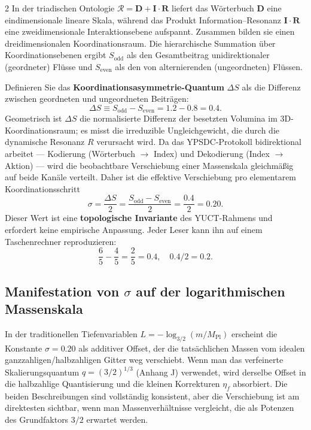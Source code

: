 \documentclass[11pt,a4paper]{article}
\begin{document}
\begin{multicols}{2}
		In der triadischen Ontologie \(\mathcal{R} = \mathbf{D} + \mathbf{I}\!\cdot\!\mathbf{R}\) liefert das Wörterbuch \(\mathbf{D}\) eine eindimensionale lineare Skala, während das Produkt Information–Resonanz \(\mathbf{I}\!\cdot\!\mathbf{R}\) eine zweidimensionale Interaktionsebene aufspannt. Zusammen bilden sie einen dreidimensionalen Koordinationsraum. Die hierarchische Summation über Koordinationsebenen ergibt \(S_{\mathrm{odd}}\) als den Gesamtbeitrag unidirektionaler (geordneter) Flüsse und \(S_{\mathrm{even}}\) als den von alternierenden (ungeordneten) Flüssen.
		
		Definieren Sie das \textbf{Koordinationsasymmetrie-Quantum} \(\Delta S\) als die Differenz zwischen geordneten und ungeordneten Beiträgen:
		\begin{equation}
			\Delta S \equiv S_{\mathrm{odd}} - S_{\mathrm{even}} = 1.2 - 0.8 = 0.4.
			\label{eq:Deltas}
		\end{equation}
		Geometrisch ist \(\Delta S\) die normalisierte Differenz der besetzten Volumina im 3D-Koordinationsraum; es misst die irreduzible Ungleichgewicht, die durch die dynamische Resonanz \(R\) verursacht wird. Da das YPSDC-Protokoll bidirektional arbeitet — Kodierung (Wörterbuch $\to$ Index) und Dekodierung (Index $\to$ Aktion) — wird die beobachtbare Verschiebung einer Massenskala gleichmäßig auf beide Kanäle verteilt. Daher ist die effektive Verschiebung pro elementarem Koordinationsschritt
		\begin{equation}
			\boxed{\sigma = \frac{\Delta S}{2} = \frac{S_{\mathrm{odd}} - S_{\mathrm{even}}}{2} = \frac{0.4}{2} = 0.20.}
			\label{eq:sigma}
		\end{equation}
		Dieser Wert ist eine \textbf{topologische Invariante} des YUCT-Rahmens und erfordert keine empirische Anpassung. Jeder Leser kann ihn auf einem Taschenrechner reproduzieren:
		\[
		\frac{6}{5} - \frac{4}{5} = \frac{2}{5} = 0.4,\quad 0.4 / 2 = 0.2.
		\]
		
		\subsection{Manifestation von \(\sigma\) auf der logarithmischen Massenskala}
		
		In der traditionellen Tiefenvariablen \(L = -\log_{3/2}(m/M_{\mathrm{Pl}})\) erscheint die Konstante \(\sigma = 0.20\) als additiver Offset, der die tatsächlichen Massen vom idealen ganzzahligen/halbzahligen Gitter weg verschiebt. Wenn man das verfeinerte Skalierungsquantum \(q = (3/2)^{1/3}\) (Anhang J) verwendet, wird derselbe Offset in die halbzahlige Quantisierung und die kleinen Korrekturen \(\eta_f\) absorbiert. Die beiden Beschreibungen sind vollständig konsistent, aber die Verschiebung ist am direktesten sichtbar, wenn man Massenverhältnisse vergleicht, die als Potenzen des Grundfaktors \(3/2\) erwartet werden.
		

\end{multicols}
\end{document}
